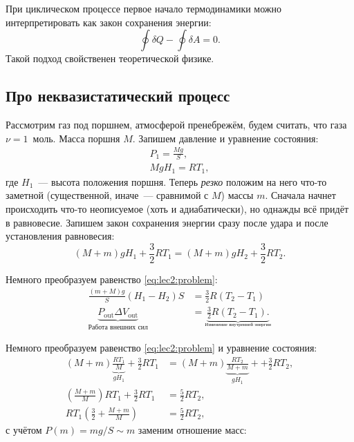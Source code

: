 \documentclass[../main.tex]{subfiles}
\begin{document}
    \begin{note}
        При циклическом процессе первое начало термодинамики можно интерпретировать как закон сохранения энергии:
        \begin{equation}
            \oint \delta Q - \oint \delta A = 0.
        \end{equation} 
        Такой подход свойственен теоретической физике.
    \end{note}
\subsection{Про неквазистатический процесс}
    Рассмотрим газ под поршнем, атмосферой пренебрежём, будем считать, что газа $\nu = 1$~моль. Масса поршня $M$. Запишем давление и уравнение состояния:
    \begin{gather}
        P_1 = \frac{Mg}{S}, \\
        MgH_1 = RT_1,
    \end{gather}
    где $H_1$~--- высота положения поршня. Теперь \emph{резко} положим на него что-то заметной (существенной, иначе~--- сравнимой с $M$) массы $m$. Сначала начнет происходить что-то неописуемое (хоть и адиабатически), но однажды всё придёт в равновесие. Запишем закон сохранения энергии сразу после удара и после установления равновесия:
    \begin{equation}
        \label{eq:lec2:problem}
        (M+m)gH_1+\frac{3}{2}RT_1=(M+m)gH_2+\frac{3}{2}RT_2.
    \end{equation}

    \begin{note}
        Немного преобразуем равенство \eqref{eq:lec2:problem}:
        \begin{align}
            \frac{(m+M)g}{S} (H_1-H_2)S &= \frac{3}{2} R (T_2 - T_1)\\
            \underbrace{P_{\text{out}} \Delta V_{\text{out}}}_{\text{Работа внешних сил}} &= \underbrace{\frac{3}{2} R (T_2 - T_1).}_{_{\text{Изменение внутренней энергии}}}
        \end{align}
    \end{note}
    \begin{note}
        Немного преобразуем равенство \eqref{eq:lec2:problem} и уравнение состояния:
        \begin{align}
            (M+m)\underbrace{\frac{RT_1}{M}}_{gH_1}+\frac{3}{2}RT_1 &= (M+m)\underbrace{\frac{RT_2}{M+m}}_{gH_1}++\frac{3}{2}RT_2, \\
            \left(\frac{M+m}{M} \right)RT_1 + \frac{3}{2}RT_1 &= \frac{5}{2}RT_2, \\
            RT_1\left(\frac{3}{2} + \frac{M+m}{M}\right)&=\frac{5}{2}RT_2,
        \end{align}
        с учётом $P(m) = mg/S \sim m$ заменим отношение масс:

    \end{note}
        
\end{document}

